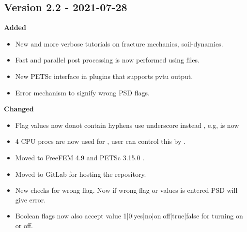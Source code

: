 \subsection{ Version 2.2 - 2021-07-28} 
\textbf{Added}
\begin{itemize}
    \item New and more verbose tutorials on fracture mechanics, soil-dynamics.
    \item Fast and parallel post processing is now performed using  files.
    \item New PETSc interface in plugins that supports pvtu output.
    \item Error mechanism to signify wrong PSD flags. 
\end{itemize}
\textbf{Changed}
\begin{itemize}
    \item Flag values now donot contain hyphens \sh{-} use underscore instead \sh{\_}, e.g, 
 is now 
    \item 4 CPU procs are now used for , user can control this by .
    \item Moved to FreeFEM 4.9 and PETSc 3.15.0 .
    \item Moved to GitLab for hosting the repository.
    \item New checks for wrong flag. Now if wrong flag or values is entered PSD will give error.
    \item Boolean flags now also accept value 1|0|yes|no|on|off|true|false for turning on or off.
\end{itemize}
